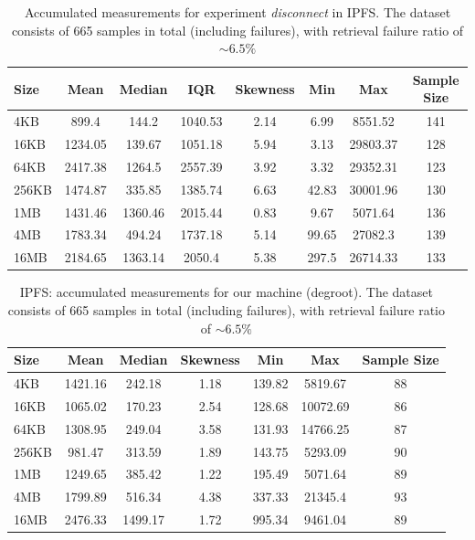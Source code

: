 \begin{table}[H]
\centering
\begin{small}
\caption{Accumulated measurements for experiment \textit{disconnect} in IPFS. The dataset consists of 665 samples in total (including failures), with retrieval failure ratio of $\sim 6.5\%$ }
\label{tab:disconnect}
\begin{tabular}{@{}lccccccc@{}}
\toprule
Size & Mean & Median & IQR & Skewness & Min & Max & Sample Size \\ \midrule
4KB & 899.4 & 144.2 & 1040.53 & 2.14 & 6.99 & 8551.52 & 141\\
16KB & 1234.05 & 139.67 & 1051.18 & 5.94 & 3.13 & 29803.37 & 128\\
64KB & 2417.38 & 1264.5 & 2557.39 & 3.92 & 3.32 & 29352.31 & 123\\
256KB & 1474.87 & 335.85 & 1385.74 & 6.63 & 42.83 & 30001.96 & 130\\
1MB & 1431.46 & 1360.46 & 2015.44 & 0.83 & 9.67 & 5071.64 & 136\\
4MB & 1783.34 & 494.24 & 1737.18 & 5.14 & 99.65 & 27082.3 & 139\\
16MB & 2184.65 & 1363.14 & 2050.4 & 5.38 & 297.5 & 26714.33 & 133\\
\bottomrule
\end{tabular}
\end{small}
\end{table}













\begin{table}[H]
\centering
\begin{small}
\caption{IPFS: accumulated measurements for our machine (degroot). The dataset consists of 665 samples in total (including failures), with retrieval failure ratio of $\sim 6.5\%$ }
\label{tab:degroot_ipfs}
\begin{tabular}{@{}lcccccc@{}}
\toprule
Size & Mean & Median & Skewness & Min & Max & Sample Size \\ \midrule
4KB & 1421.16 & 242.18 & 1.18 & 139.82 & 5819.67 & 88\\
16KB & 1065.02 & 170.23 & 2.54 & 128.68 & 10072.69 & 86\\
64KB & 1308.95 & 249.04 & 3.58 & 131.93 & 14766.25 & 87\\
256KB & 981.47 & 313.59 & 1.89 & 143.75 & 5293.09 & 90\\
1MB & 1249.65 & 385.42 & 1.22 & 195.49 & 5071.64 & 89\\
4MB & 1799.89 & 516.34 & 4.38 & 337.33 & 21345.4 & 93\\
16MB & 2476.33 & 1499.17 & 1.72 & 995.34 & 9461.04 & 89\\
\bottomrule
\end{tabular}
\end{small}
\end{table}

